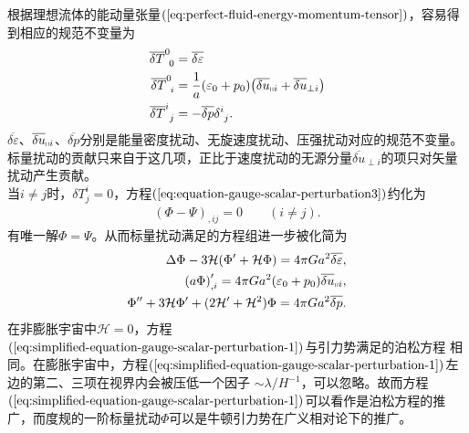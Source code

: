 根据理想流体的能动量张量$(\ref{eq:perfect-fluid-energy-momentum-tensor})$，容易得到相应的规范不变量为
\begin{align}
  \label{eq:perfect-fluid-gauge-invariant-variable}
  \overline{\delta{T}}^{0}_{\ 0} &= \overline{\delta{\varepsilon}} \\
  \overline{\delta{T}}^{0}_{\ i} &=
  \frac{1}{a}(\varepsilon_0+p_0){\left(\overline{\delta{u}}_{\shortparallel
        i}+\overline{\delta{u}}_{\perp i}\right)} \\
  \overline{\delta{T}}^{i}_{\ j}&= -\overline{\delta{p}}\delta^{i}_{\ j}.
\end{align}
$\overline{\delta{\varepsilon}}$、$\overline{\delta{u}}_{\shortparallel
i}$、$\overline{\delta{p}}$分别是能量密度扰动、无旋速度扰动、压强扰动对应的规范不变量。
标量扰动的贡献只来自于这几项，正比于速度扰动的无源分量$\overline{\delta{u}}_{\perp
i}$的项只对矢量扰动产生贡献。\\
当$i\neq
j$时，$\delta{T}^{i}_{j}=0$，方程$(\ref{eq:equation-gauge-scalar-perturbation3})$约化为
\begin{align}
  {\left(\Phi-\Psi\right)}_{,ij}=0\qquad (i\neq j).
\end{align}
有唯一解$\Phi=\Psi$。从而标量扰动满足的方程组进一步被化简为
\begin{align}
  \Delta \Phi -3\mathcal{H}{\left(\Phi^\prime+\mathcal{H}\Phi\right)} =
  4\pi Ga^2\overline{\delta{\varepsilon}},
  \label{eq:simplified-equation-gauge-scalar-perturbation-1} \\
  {\left(a\Phi\right)}^{\prime}_{,i}=4\pi
  Ga^2{\left(\varepsilon_0+p_0\right)}\overline{\delta{u}}_{\shortparallel i},
  \label{eq:simplified-equation-gauge-scalar-perturbation-2} \\
  \Phi^{\prime\prime}+3\mathcal{H}\Phi^\prime+(2\mathcal{H}^{\prime}+\mathcal{H}^2)\Phi=
  4\pi Ga^2\overline{\delta{p}}.
  \label{eq:simplified-equation-gauge-scalar-perturbation-3}
\end{align}
在非膨胀宇宙中$\mathcal{H}=0$，方程$(\ref{eq:simplified-equation-gauge-scalar-perturbation-1})$与引力势满足的泊松方程
相同。在膨胀宇宙中，方程$(\ref{eq:simplified-equation-gauge-scalar-perturbation-1})$左边的第二、三项在视界内会被压低一个因子
$\sim\lambda
/H^{-1}$，可以忽略。故而方程$(\ref{eq:simplified-equation-gauge-scalar-perturbation-1})$可以看作是泊松方程的推广，而度规的一阶标量扰动$\Phi$可以是牛顿引力势在广义相对论下的推广。

